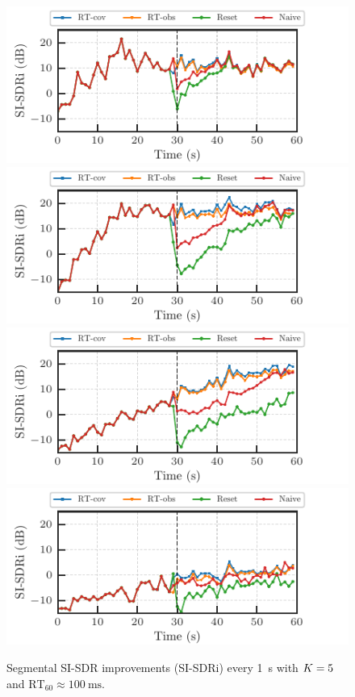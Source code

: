 \documentclass[sip,biber]{now-journal}
\begin{document}
\begin{figure}[t]
  \begin{minipage}[t]{\linewidth}
    \centering\includegraphics{figures/plots/online/Gauss_8000_fft4096_900.pdf}\label{fig:plot:gauss:900}
    \centering\includegraphics{figures/plots/online/Gauss_8000_fft4096_950.pdf}\label{fig:plot:gauss:950}
    \centering\includegraphics{figures/plots/online/Gauss_8000_fft4096_980.pdf}\label{fig:plot:gauss:980}
    \centering\includegraphics{figures/plots/online/Gauss_8000_fft4096_990.pdf}\label{fig:plot:gauss:990}
  \end{minipage}
  \caption{Segmental SI-SDR improvements (SI-SDRi) every \SI{1}{\second} with $K = 5$ and $\text{RT}_{60} \approx \SI{100}{\milli\second}$.}%
  \label{fig:plots:sisdr}
\end{figure}
\end{document}
